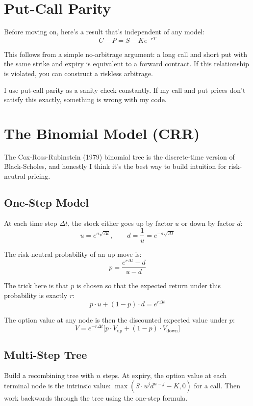 \documentclass[11pt]{article}
\begin{document}
\section{Put-Call Parity}

Before moving on, here's a result that's independent of any model:
\[
\boxed{C - P = S - K e^{-rT}}
\]

This follows from a simple no-arbitrage argument: a long call and short put with the same strike and expiry is equivalent to a forward contract. If this relationship is violated, you can construct a riskless arbitrage.

I use put-call parity as a sanity check constantly. If my call and put prices don't satisfy this exactly, something is wrong with my code.

\section{The Binomial Model (CRR)}

The Cox-Ross-Rubinstein (1979) binomial tree is the discrete-time version of Black-Scholes, and honestly I think it's the best way to build intuition for risk-neutral pricing.

\subsection{One-Step Model}

At each time step $\Delta t$, the stock either goes up by factor $u$ or down by factor $d$:
\[
u = e^{\sigma\sqrt{\Delta t}}, \qquad d = \frac{1}{u} = e^{-\sigma\sqrt{\Delta t}}
\]

The risk-neutral probability of an up move is:
\[
p = \frac{e^{r\Delta t} - d}{u - d}
\]

The trick here is that $p$ is chosen so that the expected return under this probability is exactly $r$:
\[
p \cdot u + (1-p) \cdot d = e^{r\Delta t}
\]

The option value at any node is then the discounted expected value under $p$:
\[
V = e^{-r\Delta t}\big[p \cdot V_{\text{up}} + (1-p) \cdot V_{\text{down}}\big]
\]

\subsection{Multi-Step Tree}

Build a recombining tree with $n$ steps. At expiry, the option value at each terminal node is the intrinsic value: $\max(S \cdot u^j d^{n-j} - K, 0)$ for a call. Then work backwards through the tree using the one-step formula.
\end{document}
